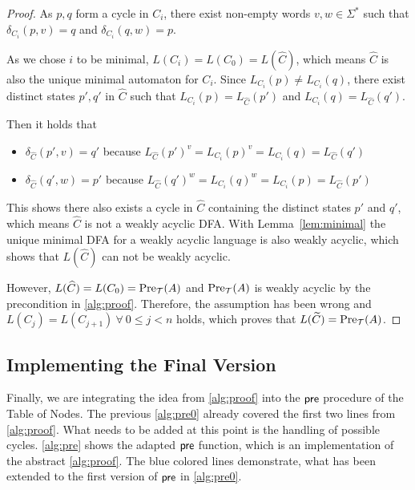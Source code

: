 \begin{proof}
As $p,q$ form a cycle in $C_{i}$, there exist non-empty words $v,w \in \Sigma^{*}$ such that $\delta_{C_{i}}(p,v) = q$ and $\delta_{C_{i}}(q,w) = p$. 

As we chose $i$ to be minimal, $L(C_{i}) = L(C_{0}) = L(\widehat{C})$, which means $\widehat{C}$ is also the unique minimal automaton for $C_{i}$. Since $L_{C_{i}}(p) \neq L_{C_{i}}(q)$, there exist distinct states $p',q'$ in $\widehat{C}$ such that $L_{C_{i}}(p) = L_{\widehat{C}}(p')$ and $L_{C_{i}}(q) = L_{\widehat{C}}(q')$. 

Then it holds that
\begin{itemize}[-,noitemsep]
\item $\delta_{\widehat{C}}(p',v) = q'$ because $L_{\widehat{C}}(p')^{v} = L_{C_{i}}(p)^{v} = L_{C_{i}}(q) = L_{\widehat{C}}(q')$
\item $\delta_{\widehat{C}}(q',w) = p'$ because
$L_{\widehat{C}}(q')^{w} = L_{C_{i}}(q)^{w} = L_{C_{i}}(p) = L_{\widehat{C}}(p')$
\end{itemize}
%

This shows there also exists a cycle in $\widehat{C}$ containing the distinct states $p'$ and $q'$, which means $\widehat{C}$ is not a weakly acyclic DFA. 
With Lemma~\autoref{lem:minimal} the unique minimal DFA for a weakly acyclic language is also weakly acyclic, which shows that $L(\widehat{C})$ can not be weakly acyclic.

However, $L(\widehat{C}) = L(C_{0}) = \operatorname{\text{Pre}}_{\mathcal{T}}(A)$ and $\operatorname{\text{Pre}}_{\mathcal{T}}(A)$ is weakly acyclic by the precondition in \autoref{alg:proof}. Therefore, the assumption has been wrong and $L(C_{j}) = L(C_{j+1}) \ \forall \ 0 \le j < n$ holds, which proves that $L(\widetilde{C}) = \operatorname{\text{Pre}}_{\mathcal{T}}(A)$. 



\end{proof}

\subsection{Implementing the Final Version}
Finally, we are integrating the idea from \autoref{alg:proof} into the $\operatorname{\textsf{pre}}$ procedure of the Table of Nodes. The previous \autoref{alg:pre0} already covered the first two lines from \autoref{alg:proof}. What needs to be added at this point is the handling of possible cycles.
\autoref{alg:pre} shows the adapted $\operatorname{\textsf{pre}}$ function, which is an implementation of the abstract \autoref{alg:proof}. The blue colored lines demonstrate, what has been extended to the first version of $\operatorname{\textsf{pre}}$ in \autoref{alg:pre0}.


